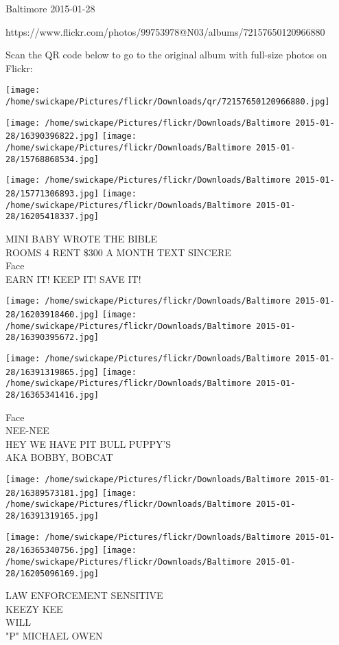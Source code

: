 \documentclass[10pt,letterpaper]{article}
\begin{document}
Baltimore 2015-01-28

https://www.flickr.com/photos/99753978@N03/albums/72157650120966880

Scan the QR code below to go to the original album with full-size photos on Flickr:

\texttt{[image: /home/swickape/Pictures/flickr/Downloads/qr/72157650120966880.jpg]}
\pagebreak

\texttt{[image: /home/swickape/Pictures/flickr/Downloads/Baltimore 2015-01-28/16390396822.jpg]}
\texttt{[image: /home/swickape/Pictures/flickr/Downloads/Baltimore 2015-01-28/15768868534.jpg]}

\texttt{[image: /home/swickape/Pictures/flickr/Downloads/Baltimore 2015-01-28/15771306893.jpg]}
\texttt{[image: /home/swickape/Pictures/flickr/Downloads/Baltimore 2015-01-28/16205418337.jpg]}

MINI BABY WROTE THE BIBLE\\
ROOMS 4 RENT \$300 A MONTH TEXT SINCERE\\
Face\\
EARN IT!  KEEP IT!  SAVE IT!
\pagebreak

\texttt{[image: /home/swickape/Pictures/flickr/Downloads/Baltimore 2015-01-28/16203918460.jpg]}
\texttt{[image: /home/swickape/Pictures/flickr/Downloads/Baltimore 2015-01-28/16390395672.jpg]}

\texttt{[image: /home/swickape/Pictures/flickr/Downloads/Baltimore 2015-01-28/16391319865.jpg]}
\texttt{[image: /home/swickape/Pictures/flickr/Downloads/Baltimore 2015-01-28/16365341416.jpg]}

Face\\
NEE{-}NEE\\
HEY WE HAVE PIT BULL PUPPY'S\\
AKA BOBBY, BOBCAT
\pagebreak

\texttt{[image: /home/swickape/Pictures/flickr/Downloads/Baltimore 2015-01-28/16389573181.jpg]}
\texttt{[image: /home/swickape/Pictures/flickr/Downloads/Baltimore 2015-01-28/16391319165.jpg]}

\texttt{[image: /home/swickape/Pictures/flickr/Downloads/Baltimore 2015-01-28/16365340756.jpg]}
\texttt{[image: /home/swickape/Pictures/flickr/Downloads/Baltimore 2015-01-28/16205096169.jpg]}

LAW ENFORCEMENT SENSITIVE\\
KEEZY KEE\\
WILL\\
"P" MICHAEL OWEN
\pagebreak
\end{document}
